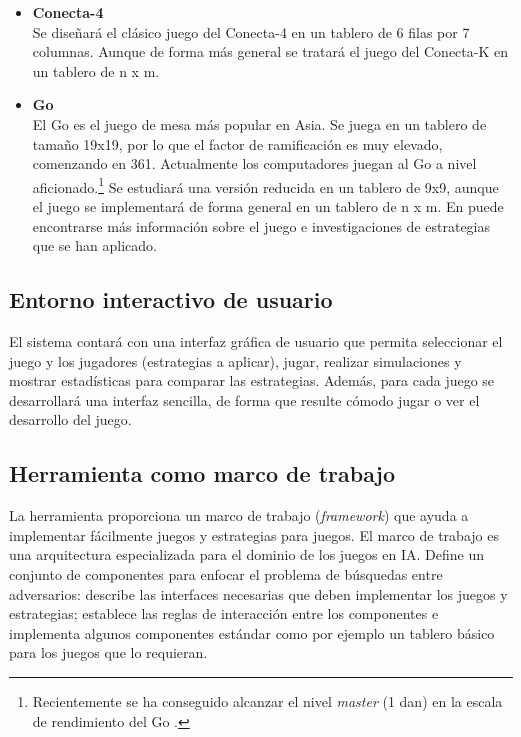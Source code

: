 \documentclass[a4paper,12pt]{article}
\begin{document}
\begin{itemize}
	\item \textbf{Conecta-4}\\	
	Se diseñará el clásico juego del Conecta-4 en un tablero de 6 filas por 7 columnas.
	Aunque de forma más general se tratará el juego del Conecta-K en un tablero de n x m.	
	\item \textbf{Go}\\	
	El Go es el juego de mesa más popular en Asia.
	Se juega en un tablero de tamaño 19x19, por lo que el factor de ramificación es muy elevado, comenzando en 361.
	Actualmente los computadores juegan al Go a nivel aficionado.\footnote{Recientemente se ha conseguido alcanzar el nivel \textit{master} (1 dan) en la escala de rendimiento del Go \cite{MonteCarlo}.}
	Se estudiará una versión reducida en un tablero de 9x9, aunque el juego se implementará de forma general en un tablero de n x m.
	En \cite{GameGo} puede encontrarse más información sobre el juego e investigaciones de estrategias que se han aplicado.

\end{itemize}

\subsection{Entorno interactivo de usuario}
\par 
El sistema contará con una interfaz gráfica de usuario que permita seleccionar el juego y los jugadores (estrategias a aplicar), jugar, realizar simulaciones y mostrar estadísticas para comparar las estrategias.
Además, para cada juego se desarrollará una interfaz sencilla, de forma que resulte cómodo jugar o ver el desarrollo del juego.

\subsection{Herramienta como marco de trabajo} 
\par
La herramienta proporciona un marco de trabajo (\textit{framework}) que ayuda a implementar fácilmente juegos y estrategias para juegos.
El marco de trabajo es una arquitectura especializada para el dominio de los juegos en IA.
Define un conjunto de componentes para enfocar el problema de búsquedas entre adversarios: describe las interfaces necesarias que deben implementar los juegos y estrategias; establece las reglas de interacción entre los componentes e implementa algunos componentes estándar como por ejemplo un tablero básico para los juegos que lo requieran.
\end{document}
